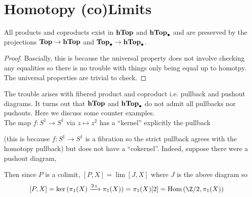 \documentclass[12pt]{extarticle}
\begin{document}
\section{Homotopy (co)Limits}

\begin{prop}
All products and coproducts exist in $\mathbf{hTop}$ and $\mathbf{hTop}_{\bullet}$ and are preserved by the projections $\mathbf{Top} \to \mathbf{hTop}$ and $\mathbf{Top}_{\bullet} \to \mathbf{hTop}_{\bullet}$.
\end{prop}

\begin{proof}
Bascially, this is because the universal property does not involve checking any equalities so there is no trouble with things only being equal up to homotpy. The universal properties are trivial to check.
\end{proof}

\begin{rmk}
The trouble arises with fibered product and coproduct i.e. pullback and pushout diagrams. It turns out that $\mathbf{hTop}$ and $\mathbf{hTop}_{\bullet}$ do not admit all pullbacks nor pushouts. Here we discuss some counter examples.
\bigskip\\
The map $f : S^1 \to S^1$ via $z \mapsto z^2$ has a ``kernel'' explicitly the pullback
\begin{center}
\end{center}
(this is because $f : S^1 \to S^1$ is a fibration so the strict pullback agrees with the homotopy pullback) but does not have a ``cokernel''. Indeed, suppose there were a pushout diagram,
\begin{center}
\end{center}
Then since $P$ is a colimit, $[P, X] = \lim [J, X]$ where $J$ is the above diagram so 
\[ [P, X] = \ker{(\pi_1(X) \xrightarrow{2 \times} \pi_1(X))} = \pi_1(X)[2] = \Hom{\Z/2}{\pi_1(X)} \]
\end{rmk}
\end{document}

